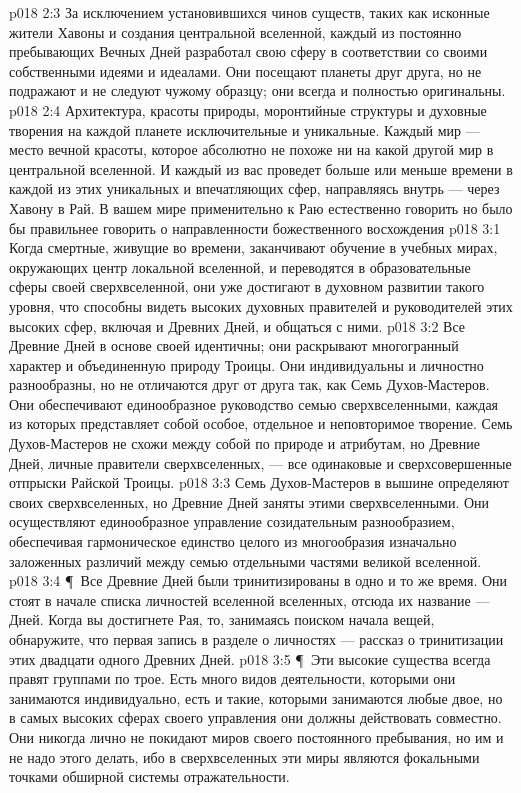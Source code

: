 \vs p018 2:3 За исключением установившихся чинов существ, таких как исконные жители Хавоны и создания центральной вселенной, каждый из постоянно пребывающих Вечных Дней разработал свою сферу в соответствии со своими собственными идеями и идеалами. Они посещают планеты друг друга, но не подражают и не следуют чужому образцу; они всегда и полностью оригинальны.
\vs p018 2:4 Архитектура, красоты природы, моронтийные структуры и духовные творения на каждой планете исключительные и уникальные. Каждый мир --- место вечной красоты, которое абсолютно не похоже ни на какой другой мир в центральной вселенной. И каждый из вас проведет больше или меньше времени в каждой из этих уникальных и впечатляющих сфер, направляясь внутрь --- через Хавону в Рай. В вашем мире применительно к Раю естественно говорить  но было бы правильнее говорить о направленности божественного восхождения 
\vs p018 3:1 Когда смертные, живущие во времени, заканчивают обучение в учебных мирах, окружающих центр локальной вселенной, и переводятся в образовательные сферы своей сверхвселенной, они уже достигают в духовном развитии такого уровня, что способны видеть высоких духовных правителей и руководителей этих высоких сфер, включая и Древних Дней, и общаться с ними.
\vs p018 3:2 Все Древние Дней в основе своей идентичны; они раскрывают многогранный характер и объединенную природу Троицы. Они индивидуальны и личностно разнообразны, но не отличаются друг от друга так, как Семь Духов\hyp{}Мастеров. Они обеспечивают единообразное руководство семью сверхвселенными, каждая из которых представляет собой особое, отдельное и неповторимое творение. Семь Духов\hyp{}Мастеров не схожи между собой по природе и атрибутам, но Древние Дней, личные правители сверхвселенных, --- все одинаковые и сверхсовершенные отпрыски Райской Троицы.
\vs p018 3:3 Семь Духов\hyp{}Мастеров в вышине определяют  своих сверхвселенных, но Древние Дней заняты  этими сверхвселенными. Они осуществляют единообразное управление созидательным разнообразием, обеспечивая гармоническое единство целого из многообразия изначально заложенных различий между семью отдельными частями великой вселенной.
\vs p018 3:4 \P\ Все Древние Дней были тринитизированы в одно и то же время. Они стоят в начале списка личностей вселенной вселенных, отсюда их название ---  Дней. Когда вы достигнете Рая, то, занимаясь поиском начала вещей, обнаружите, что первая запись в разделе о личностях --- рассказ о тринитизации этих двадцати одного Древних Дней.
\vs p018 3:5 \P\ Эти высокие существа всегда правят группами по трое. Есть много видов деятельности, которыми они занимаются индивидуально, есть и такие, которыми занимаются любые двое, но в самых высоких сферах своего управления они должны действовать совместно. Они никогда лично не покидают миров своего постоянного пребывания, но им и не надо этого делать, ибо в сверхвселенных эти миры являются фокальными точками обширной системы отражательности.
